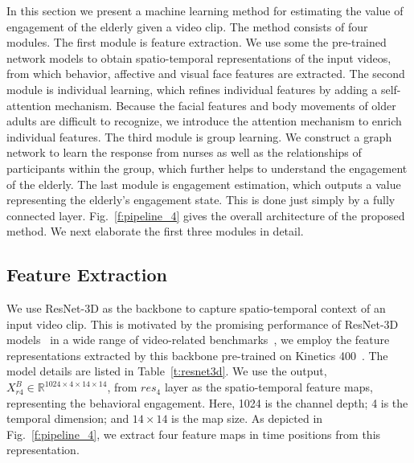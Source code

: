 \documentclass[twocolumn]{svjour3}
\begin{document}
In this section we present a machine learning method for estimating the value of engagement of the elderly given a video clip. The method consists of four modules.
The first module is feature extraction. We use some the pre-trained network models to obtain spatio-temporal representations of the input videos, from which behavior, affective and visual face features are extracted. The second module is individual learning, which refines individual features by adding a self-attention mechanism. Because the facial features and body movements of older adults are difficult to recognize, we introduce the attention mechanism to enrich individual features. The third module is group learning. We construct a graph network to learn the response from nurses as well as the relationships of participants within the group, which further helps to understand the engagement of the elderly. The last module is engagement estimation, which outputs a value representing the elderly's engagement state. This is done just simply by a fully connected layer. Fig.~\ref{f:pipeline_4} gives the overall architecture of the proposed method. We next elaborate the first three modules in detail.



\subsection{Feature Extraction}
\label{subs:Feature_Extraction}

We use ResNet-3D as the backbone to capture spatio-temporal context of an input video clip. This is motivated by the promising performance of ResNet-3D models~\cite{Hara2018Can} in a wide range of video-related benchmarks~\cite{Chen2021Deep}, we employ the feature representations extracted by this backbone pre-trained on Kinetics 400~\cite{Kay2017Kinetics}. The model details are listed in Table~\ref{t:resnet3d}. We use the output, $X^B_{r4} \in \mathbb{R}^{1024\times4\times14\times14}$, from $res_4$ layer as the spatio-temporal feature maps, representing the behavioral engagement. Here, 1024 is the channel depth; 4 is the temporal dimension; and $14\times14$ is the map size. As depicted in Fig.~\ref{f:pipeline_4}, we extract four feature maps in time positions from this representation.
\end{document}
